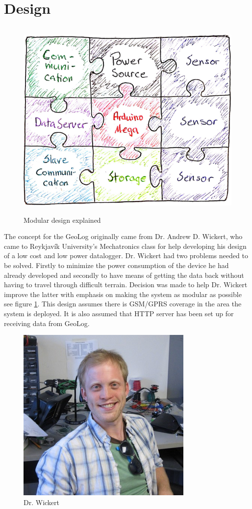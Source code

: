 \section{Design}
\begin{figure}[H]
        \centering
        \includegraphics[height=10cm]{graphics/Puzzle}
        \caption{Modular design explained}
        \label{fig:Puzzle}
\end{figure}
The concept for the GeoLog originally came from Dr. Andrew D. Wickert, who came to Reykjavík University's Mechatronics class for 
help developing his design of a low cost and low power datalogger\cite{ALog-BottleLogger}. 
Dr. Wickert had two problems needed to be solved. Firstly to minimize the power consumption of the device he had already developed and secondly to have means of getting the data
back without having to travel through difficult terrain. Decision was made to help Dr. Wickert 
improve the latter with emphasis on making the system as modular as possible see figure \ref{fig:Puzzle}. This design assumes 
there is GSM/GPRS coverage in the area the system is deployed. It is also assumed that HTTP server has been set up for receiving data from GeoLog.
\begin{figure}
\centering
\includegraphics[width=0.4\linewidth]{graphics/andrewWickert}
\caption{Dr. Wickert\label{fig:andrewWickert}\cite{andrewWickert}}
\end{figure}
